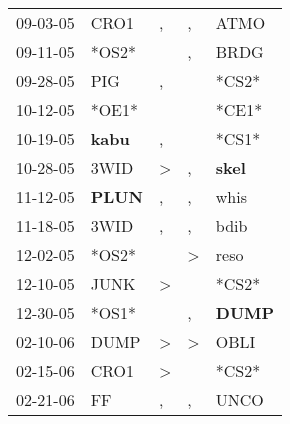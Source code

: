 \begin{supertabular}{p{0.07\textwidth}p{0.06\textwidth}p{0.02\textwidth}p{0.02\textwidth}p{0.06\textwidth}}
          09-03-05\textsuperscript{} &           CRO1\textsuperscript{} &                , &                , &           ATMO\textsuperscript{} \\
          09-11-05\textsuperscript{} &                            *OS2* &                  &                , &           BRDG\textsuperscript{} \\
          09-28-05\textsuperscript{} &            PIG\textsuperscript{} &                , &                  &                            *CS2* \\
          10-12-05\textsuperscript{} &                            *OE1* &                  &                  &                            *CE1* \\
          10-19-05\textsuperscript{} &  \textbf{kabu\textsuperscript{}} &                , &                  &                            *CS1* \\
          10-28-05\textsuperscript{} &           3WID\textsuperscript{} &     \textgreater &                , &  \textbf{skel\textsuperscript{}} \\
          11-12-05\textsuperscript{} &  \textbf{PLUN\textsuperscript{}} &                , &                , &           whis\textsuperscript{} \\
          11-18-05\textsuperscript{} &           3WID\textsuperscript{} &                , &                , &           bdib\textsuperscript{} \\
          12-02-05\textsuperscript{} &                            *OS2* &                  &     \textgreater &           reso\textsuperscript{} \\
          12-10-05\textsuperscript{} &           JUNK\textsuperscript{} &     \textgreater &                  &                            *CS2* \\
          12-30-05\textsuperscript{} &                            *OS1* &                  &                , &  \textbf{DUMP\textsuperscript{}} \\
          02-10-06\textsuperscript{} &           DUMP\textsuperscript{} &     \textgreater &     \textgreater &           OBLI\textsuperscript{} \\
          02-15-06\textsuperscript{} &           CRO1\textsuperscript{} &     \textgreater &                  &                            *CS2* \\
          02-21-06\textsuperscript{} &             FF\textsuperscript{} &                , &                , &           UNCO\textsuperscript{} \\

\end{supertabular}
